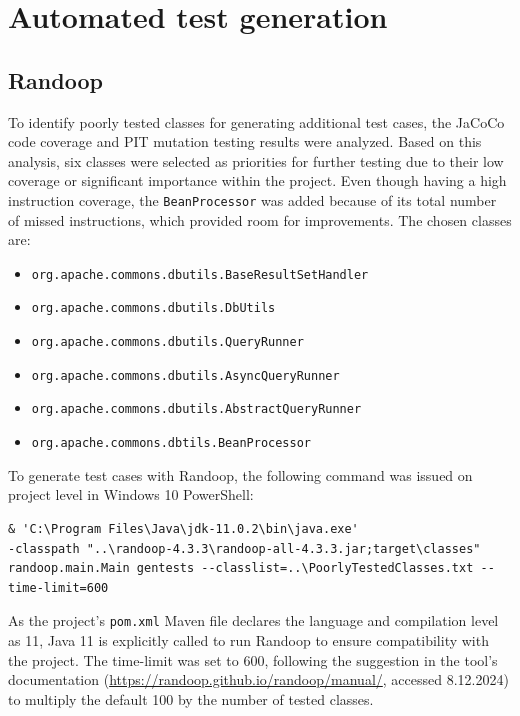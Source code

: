\documentclass[sigconf]{acmart}
\begin{document}
\section{Automated test generation}
\subsection*{Randoop}

To identify poorly tested classes for generating additional test cases, the JaCoCo code coverage and PIT mutation testing results were analyzed. Based on this analysis, six classes were selected as priorities for further testing due to their low coverage or significant importance within the project. Even though having a high instruction coverage, the \texttt{BeanProcessor} was added because of its total number of missed instructions, which provided room for improvements. The chosen classes are:

\begin{itemize}
    \item \texttt{org.apache.commons.dbutils.BaseResultSetHandler}
    \item \texttt{org.apache.commons.dbutils.DbUtils}
    \item \texttt{org.apache.commons.dbutils.QueryRunner}
    \item \texttt{org.apache.commons.dbutils.AsyncQueryRunner}
    \item \texttt{org.apache.commons.dbutils.AbstractQueryRunner}
    \item \texttt{org.apache.commons.dbtils.BeanProcessor}
\end{itemize}

To generate test cases with Randoop, the following command was issued on project level in Windows 10 PowerShell:

\begin{lstlisting}
& 'C:\Program Files\Java\jdk-11.0.2\bin\java.exe' 
-classpath "..\randoop-4.3.3\randoop-all-4.3.3.jar;target\classes" 
randoop.main.Main gentests --classlist=..\PoorlyTestedClasses.txt --time-limit=600
\end{lstlisting}

As the project’s \texttt{pom.xml} Maven file declares the language and compilation level as 11, Java 11 is explicitly called to run Randoop to ensure compatibility with the project. The time-limit was set to 600, following the suggestion in the tool’s documentation (\href{https://randoop.github.io/randoop/manual/}{https://randoop.github.io/randoop/manual/}, accessed 8.12.2024) to multiply the default 100 by the number of tested classes.
\end{document}
